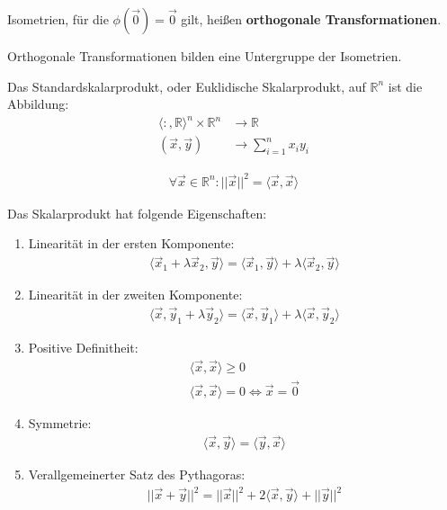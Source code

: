 \documentclass{report}
\newcommand*{\newpar}{\par\vspace{\baselineskip}\noindent}
\newcommand{\tbf}[1]{\textbf{#1}}
\newcommand{\bR}{\mathbb{R}}
\newcommand{\vx}{\vec{x}}
\newcommand{\vy}{\vec{y}}
\newcommand{\vz}{\vec{0}}
\newcommand{\scalar}[2]{\langle #1, #2 \rangle}
\begin{document}
\begin{definition}
 Isometrien, für die $\phi(\vz) = \vz$ gilt, heißen \tbf{orthogonale Transformationen}. 
\end{definition}
\newpar
Orthogonale Transformationen bilden eine Untergruppe der Isometrien.
\newpar
\begin{definition}
Das Standardskalarprodukt, oder Euklidische Skalarprodukt, auf $\bR^n$ ist die Abbildung:
\begin{align*}
 \scalar : \bR^n \times \bR^n &\to \bR\\
                    (\vx, \vy) &\to \sum_{i=1}^n x_i y_i
\end{align*}
\end{definition}
\begin{anmerkung}
\begin{align*}
 \forall \vx \in \bR^n : ||\vx||^2 = \langle \vx, \vx \rangle
\end{align*}
\end{anmerkung}
\begin{anmerkung}
 Das Skalarprodukt hat folgende Eigenschaften:
 \begin{enumerate}
  \item Linearität in der ersten Komponente:
  \begin{align*}
   \langle \vx_1 + \lambda \vx_2, \vy \rangle = \langle \vx_1, \vy \rangle + \lambda \langle \vx_2, \vy \rangle
  \end{align*}
  \item Linearität in der zweiten Komponente:
  \begin{align*}
   \langle \vx, \vy_1 + \lambda \vy_2 \rangle = \langle \vx, \vy_1 \rangle + \lambda \langle \vx, \vy_2 \rangle
  \end{align*}
  \item Positive Definitheit:
  \begin{align*}
   \langle \vx, \vx \rangle \geq 0\\
   \langle \vx, \vx \rangle = 0 \Leftrightarrow \vx = \vz
  \end{align*}
  \item Symmetrie:
  \begin{align*}
   \scalar{\vx}{\vy} = \scalar{\vy}{\vx}
  \end{align*}
  \item Verallgemeinerter Satz des Pythagoras:
  \begin{align*}
   || \vx + \vy ||^2 = ||\vx||^2 + 2 \scalar{\vx}{\vy} + ||\vy||^2
  \end{align*}

 \end{enumerate}
\end{anmerkung}
\end{document}
